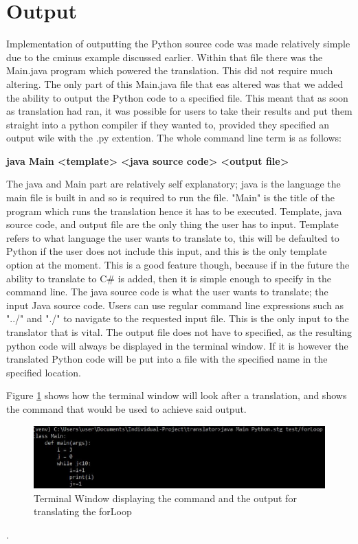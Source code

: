 \documentclass{l4proj}
\begin{document}
\section{Output}
Implementation of outputting the Python source code was made relatively simple due to the cminus example discussed earlier. Within that file there was the Main.java program which powered the translation. This did not require much altering. The only part of this Main.java file that eas altered was that we added the ability to output the Python code to a specified file. This meant that as soon as translation had ran, it was possible for users to take their results and put them straight into a python compiler if they wanted to, provided they specified an output wile with the .py extention. The whole command line term is as follows:

\textbf{java Main <template> <java source code> <output file>}

The java and Main part are relatively self explanatory; java is the language the main file is built in and so is required to run the file. "Main" is the title of the program which runs the translation hence it has to be executed. Template, java source code, and output file are the only thing the user has to input. Template refers to what language the user wants to translate to, this will be defaulted to Python if the user does not include this input, and this is the only template option at the moment. This is a good feature though, because if in the future the ability to translate to C# is added, then it is simple enough to specify in the command line. The java source code is what the user wants to translate; the input Java source code. Users can use regular command line expressions such as "../" and "./" to navigate to the requested input file. This is the only input to the translator that is vital. The output file does not have to specified, as the resulting python code will always be displayed in the terminal window. If it is however the translated Python code will be put into a file with the specified name in the specified location.

Figure \ref{fig:terminal} shows how the terminal window will look after a translation, and shows the command that would be used to achieve said output.

\begin{figure}[htb]
    \centering
    \includegraphics[width=1\linewidth]{images/terminal.JPG}
        \caption{Terminal Window displaying the command and the output for translating the forLoop
    }
    \label{fig:terminal} 
\end{figure}.
\end{document}
